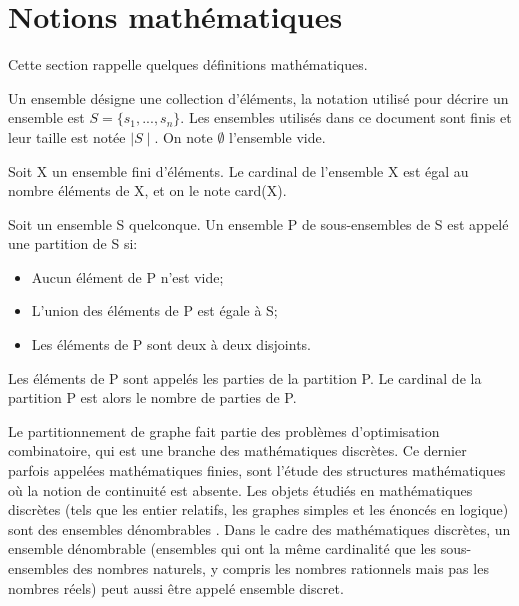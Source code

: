 
\section{Notions mathématiques}
Cette section rappelle quelques définitions mathématiques.
\begin{definition}[Ensemble]
Un ensemble désigne une collection d'éléments, la notation utilisé pour décrire un ensemble est $S =\{s_1, . . ., s_n\}$. Les ensembles utilisés dans ce document sont finis et leur taille est notée $\mid S \mid$. On note $\emptyset$ l'ensemble vide.
\end{definition}

\begin{definition}
Soit X un ensemble fini d'éléments. Le cardinal de l'ensemble X est égal au nombre éléments de X, et on le note card(X).
\end{definition}

\begin{definition}[Partition]
Soit un ensemble S quelconque. Un ensemble P de sous-ensembles de S est appelé une partition de S si:
\begin{itemize}
	\item Aucun élément de P n'est vide;
	\item L'union des éléments de P est égale à S;
	\item Les éléments de P sont deux à deux disjoints.
\end{itemize}
 Les éléments de P sont appelés les parties de la partition P. Le cardinal de la partition P est alors le nombre de parties de P.
\end{definition}

Le partitionnement de graphe fait partie des problèmes d'optimisation combinatoire, qui est une branche des mathématiques discrètes. Ce dernier parfois appelées mathématiques finies, sont l'étude des structures mathématiques où la notion de continuité est absente. Les objets étudiés en mathématiques discrètes (tels que les entier relatifs, les graphes simples et les énoncés en logique) sont des ensembles dénombrables \citep{Norman1989}. Dans le cadre des mathématiques discrètes, un ensemble dénombrable (ensembles qui ont la même cardinalité que les sous-ensembles des nombres naturels, y compris les nombres rationnels mais pas les nombres réels) peut aussi être appelé ensemble discret.
